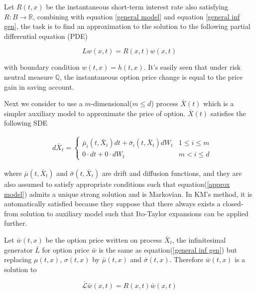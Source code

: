 Let $R(t,x)$ be the instantaneous short-term interest rate also satisfying $R: B \rightarrow \mathbb R$, combining with equation \eqref{general model} and equation \eqref{general inf gen}, the task is to find an approximation to the solution to the following partial differential equation (PDE)

\begin{equation}\label{pde under general}
    Lw(x,t) = R(x,t)w(x,t)
\end{equation}

\noindent with boundary condition $w(t,x) = h(t,x)$. It's easily seen that under risk neutral measure $\mathbb Q$, the instantaneous option price change is equal to the price gain in saving account. 

Next we consider to use a $m$-dimensional($m \leq d$) process $\bar{X}(t)$ which is a simpler auxiliary model to approximate the price of option. $\bar{X}(t)$ satisfies the following SDE

\begin{equation}\label{approx model}
    \begin{aligned}
        &d\bar{X}_t= \begin{cases}   \bar{\mu}_i(t, \bar{X}_t) dt + \bar{\sigma}_i(t, \bar{X}_t) dW_t & 1 \leq i \leq m \\
        0 \cdot dt + 0 \cdot dW_t & m < i \leq d \end{cases}
        \end{aligned}
\end{equation}

\noindent where $\bar{\mu}(t, \bar{X}_t)$ and $\bar{\sigma}(t, \bar{X}_t)$ are drift and diffusion functions, and they are also assumed to satisfy appropriate conditions such that equation(\ref{approx model}) admits a unique strong solution and is Markovian. In KM's method, it is automatically satisfied because they suppose that there always exists a closed-from solution to auxiliary model such that Ito-Taylor expansions can be applied further.

Let $\bar{w}(t,x)$ be the option price written on process $\bar{X}_t$, the infinitesimal generator $\bar{L}$ for option price $\bar{w}$ is the same as equation(\ref{general inf gen}) but replacing $\mu(t,x)$, $\sigma(t,x)$ by $\bar{\mu}(t,x)$ and $\bar{\sigma}(t,x)$. Therefore $\bar{w}(t,x)$ is a solution to

\begin{equation}\label{pde under approx}
    \mathcal{\bar{L}}\bar{w}(x,t) = R(x,t)\bar{w}(x,t)
\end{equation}

